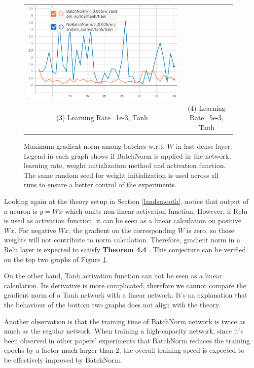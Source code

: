 \documentclass{article}
\begin{document}
\begin{figure}[h]
\begin{tabular}{cc}
  \includegraphics[scale=0.3]{pics/batchNorm/BatchNorm_tanh_5.jpg}\\
  (3) Learning Rate=1e-3, Tanh & (4) Learning Rate=5e-3, Tanh\\[6pt]
\end{tabular}
\caption{Maximum gradient norm among batches w.r.t. $W$ in last dense layer. Legend in each graph shows if BatchNorm is applied in the network, learning rate, weight initialization method and activation function. The same random seed for weight initialization is used across all runs to ensure a better control of the experiments.}
\label{fig:maxgradient}
\end{figure}

Looking again at the theory setup in Section \ref{landsmooth}, notice that output of a neuron is $y=Wx$ which omits non-linear activation function. However, if Relu is used as activation function, it can be seen as a linear calculation on positive $Wx$. For negative $Wx$, the gradient on the corresponding $W$ is zero, so those weights will not contribute to norm calculation. Therefore, gradient norm in a Relu layer is expected to satisfy \textbf{Theorem 4.4} . This conjecture can be verified on the top two graphs of Figure \ref{fig:maxgradient}. 

On the other hand, Tanh activation function can not be seen as a linear calculation. Its derivative is more complicated, therefore we cannot compare the gradient norm of a Tanh network with a linear network. It's an explanation that the behaviour of the bottom two graphs does not align with the theory.

Another observation is that the training time of BatchNorm network is twice as much as the regular network. When training a high-capacity network, since it's been observed in other papers' experiments that BatchNorm reduces the training epochs by a factor much larger than 2, the overall training speed is expected to be effectively improved by BatchNorm.
\end{document}

